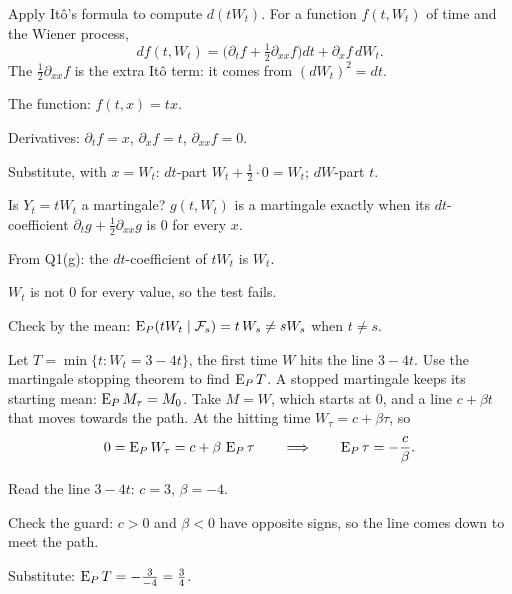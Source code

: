 \begin{problem}[Q1(g)]
Apply Itô's formula to compute $d(tW_t)$.
\cardsays For a function $f(t,W_t)$ of time and the Wiener process,
\[
df(t,W_t)=\Big(\partial_tf+\tfrac12\partial_{xx}f\Big)dt+\partial_xf\,dW_t.
\]
The $\frac12\partial_{xx}f$ is the extra Itô term: it comes from $(dW_t)^2=dt$.
\working
\begin{steps}
\item The function: $f(t,x)=tx$.
\item Derivatives: $\partial_tf=x$, $\partial_xf=t$, $\partial_{xx}f=0$.
\item Substitute, with $x=W_t$: $dt$-part $W_t+\frac12\cdot0=W_t$; $dW$-part $t$.
\end{steps}
\end{problem}

\begin{problem}[Q1(h)]
Is $Y_t=tW_t$ a martingale?
\cardsays $g(t,W_t)$ is a martingale exactly when its $dt$-coefficient $\partial_tg+\frac12\partial_{xx}g$ is $0$ for every $x$.
\working
\begin{steps}
\item From Q1(g): the $dt$-coefficient of $tW_t$ is $W_t$.
\item $W_t$ is not $0$ for every value, so the test fails.
\item Check by the mean: $\operatorname{E}_P(tW_t\mid\mathcal F_s)=t\,W_s\ne sW_s$ when $t\ne s$.
\end{steps}
\end{problem}

\begin{problem}[Q1(i)]
Let $T=\min\{t:W_t=3-4t\}$, the first time $W$ hits the line $3-4t$. Use the martingale stopping theorem to find $\operatorname{E}_PT$.
\cardsays A stopped martingale keeps its starting mean: $\operatorname{E}_PM_\tau=M_0$. Take $M=W$, which starts at $0$, and a line $c+\beta t$ that moves towards the path. At the hitting time $W_\tau=c+\beta\tau$, so
\[
0=\operatorname{E}_PW_\tau=c+\beta\,\operatorname{E}_P\tau\qquad\Longrightarrow\qquad\operatorname{E}_P\tau=-\frac c\beta.
\]
\working
\begin{steps}
\item Read the line $3-4t$: $c=3$, $\beta=-4$.
\item Check the guard: $c>0$ and $\beta<0$ have opposite signs, so the line comes down to meet the path.
\item Substitute: $\operatorname{E}_PT=-\frac{3}{-4}=\frac34$.
\end{steps}
\end{problem}

